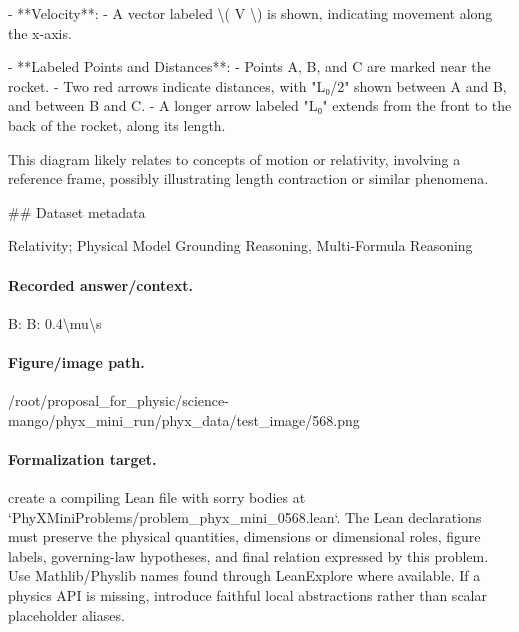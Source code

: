 - **Velocity**:
  - A vector labeled \textbackslash{}( V \textbackslash{}) is shown, indicating movement along the x-axis.

- **Labeled Points and Distances**:
  - Points A, B, and C are marked near the rocket.
  - Two red arrows indicate distances, with "L₀/2" shown between A and B, and between B and C.
  - A longer arrow labeled "L₀" extends from the front to the back of the rocket, along its length.

This diagram likely relates to concepts of motion or relativity, involving a reference frame, possibly illustrating length contraction or similar phenomena.

\#\# Dataset metadata

Relativity; Physical Model Grounding Reasoning, Multi-Formula Reasoning

\paragraph{Recorded answer/context.}
B: B: 0.4\textbackslash{}mu\textbackslash{}s

\paragraph{Figure/image path.}
/root/proposal\_for\_physic/science-mango/phyx\_mini\_run/phyx\_data/test\_image/568.png

\paragraph{Formalization target.}
create a compiling Lean file with sorry bodies at `PhyXMiniProblems/problem\_phyx\_mini\_0568.lean`. The Lean declarations must preserve the physical quantities, dimensions or dimensional roles, figure labels, governing-law hypotheses, and final relation expressed by this problem.
Use Mathlib/Physlib names found through LeanExplore where available. If a physics API is missing, introduce faithful local abstractions rather than scalar placeholder aliases.

